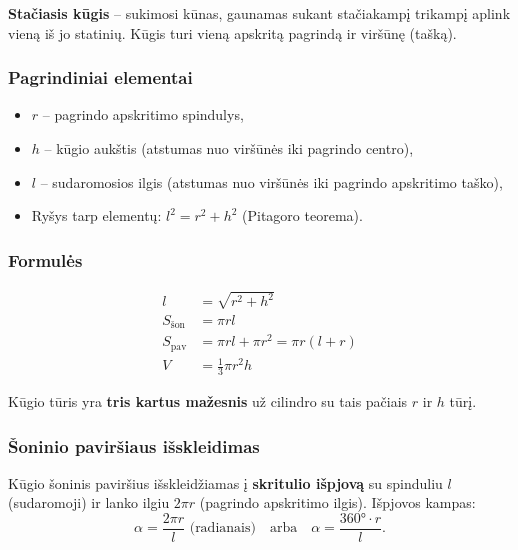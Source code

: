 \begin{definition}
\textbf{Stačiasis kūgis} – sukimosi kūnas, gaunamas sukant stačiakampį trikampį aplink vieną iš jo statinių. Kūgis turi vieną apskritą pagrindą ir viršūnę (tašką).
\end{definition}

\subsubsection*{Pagrindiniai elementai}

\begin{itemize}
    \item $r$ – pagrindo apskritimo spindulys,
    \item $h$ – kūgio aukštis (atstumas nuo viršūnės iki pagrindo centro),
    \item $l$ – sudaromosios ilgis (atstumas nuo viršūnės iki pagrindo apskritimo taško),
    \item Ryšys tarp elementų: $l^2 = r^2 + h^2$ (Pitagoro teorema).
\end{itemize}

\subsubsection*{Formulės}

\begin{tcolorbox}[title=Kūgio formulės, colback=green!5!white, colframe=green!60!black]
\begin{align}
    l &= \sqrt{r^2 + h^2} \\
    S_{\text{šon}} &= \pi r l \\
    S_{\text{pav}} &= \pi r l + \pi r^2 = \pi r(l + r) \\
    V &= \frac{1}{3}\pi r^2 h
\end{align}
\end{tcolorbox}

\noindent Kūgio tūris yra \textbf{tris kartus mažesnis} už cilindro su tais pačiais $r$ ir $h$ tūrį.

\subsubsection*{Šoninio paviršiaus išskleidimas}

Kūgio šoninis paviršius išskleidžiamas į \textbf{skritulio išpjovą} su spinduliu $l$ (sudaromoji) ir lanko ilgiu $2\pi r$ (pagrindo apskritimo ilgis). Išpjovos kampas:
\[
    \alpha = \frac{2\pi r}{l} \text{ (radianais)} \quad \text{arba} \quad \alpha = \frac{360° \cdot r}{l}.
\]

